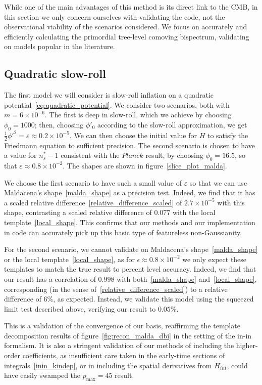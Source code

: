\documentclass[a4paper,12pt]{extarticle}
\newcommand{\Pmax}{p_\text{max}}
\newcommand{\Hint}{H_{int}}
\begin{document}
While one of the main advantages of this method is its direct link
to the CMB, in this section we only concern ourselves with validating the
code, not the observational viability of the scenarios considered.
We focus on accurately and efficiently calculating the primordial
tree-level comoving bispectrum, validating on models popular in the
literature.
\subsection{Quadratic slow-roll}
The first model we will consider is slow-roll inflation
on a quadratic potential~\eqref{eq:quadratic_potential}.
We consider two scenarios, both with $m=6\times10^{-6}$.
The first is deep in slow-roll, which we achieve by choosing
$\phi_0=1000$; then, choosing $\phi'_0$ according to the
slow-roll approximation, we get
$\frac{1}{2}\phi'^2=\varepsilon\approx0.2\times10^{-5}$.
We can then choose the initial value for $H$ to
satisfy the Friedmann equation to sufficient precision.
The second scenario is chosen to have a value for $n_s^{*}-1$
consistent with the $\textit{Planck}$ result,
by choosing $\phi_0=16.5$, so that $\varepsilon\approx0.8\times10^{-2}$.
The shapes are shown in figure~\ref{slice_plot_malda}.


We choose the first scenario to have such a small value of $\varepsilon$
so that we can use Maldacena's shape~\eqref{malda_shape}
as a precision test.
Indeed, we find that it has a scaled relative difference~\eqref{relative_difference_scaled}
of $2.7\times10^{-5}$ with this shape,
contrasting a scaled relative difference
of $0.077$ with the local template~\eqref{local_shape}.
This confirms that our methods and our implementation in code can accurately
pick up this basic type of featureless non-Gaussianity.


For the second scenario, we cannot validate on
Maldacena's shape~\eqref{malda_shape} or the
local template~\eqref{local_shape},
as for $\epsilon\approx0.8\times10^{-2}$ we only expect
these templates to match the true result to percent level accuracy.
Indeed, we find that our result has a correlation of $0.998$
with both~\eqref{malda_shape} and~\eqref{local_shape},
corresponding (in the sense of~\eqref{relative_difference_scaled})
to a relative difference of $6\%$,
as expected.
Instead, we validate this model using
the squeezed limit test described above,
verifying our result to $0.05\%$.


This is a validation of the convergence of our basis,
reaffirming the template decomposition results of figure~\ref{fig:recon_malda_dbi}
in the setting of the in-in formalism.
It is also a stringent validation of our methods of including the higher-order
coefficients, as insufficient care taken in the early-time sections of
integrals~\eqref{inin_kindep}, or in including the spatial derivatives
from $\Hint$, could have easily swamped the $\Pmax=45$ result.
\end{document}
